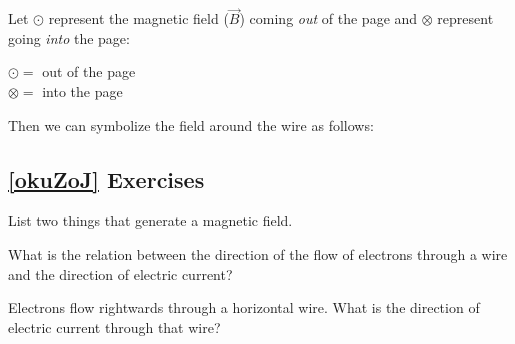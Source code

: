 \documentclass{article}
\begin{document}
\vspace{1em}

Let $\odot$ represent the magnetic field ($\vec{B}$) coming \textit{out} of the page and $\otimes$ represent going \textit{into} the page:


\begin{center}
    $\odot = $ out of the page\\
    $\otimes = $ into the page
\end{center}

\clearpage

Then we can symbolize the field around the wire as follows:

\begin{center}
\captionsetup{type=figure,margin=1in}
\end{center}

\subsection*{\ref{okuZoJ} Exercises}

\begin{exercise}
    List two things that generate a magnetic field.
\end{exercise}

\begin{exercise}
    What is the relation between the direction of the flow of electrons through a wire and the direction of electric current?
\end{exercise}

\begin{exercise}
    Electrons flow rightwards through a horizontal wire. What is the direction of electric current through that wire?
\end{exercise}
\end{document}
